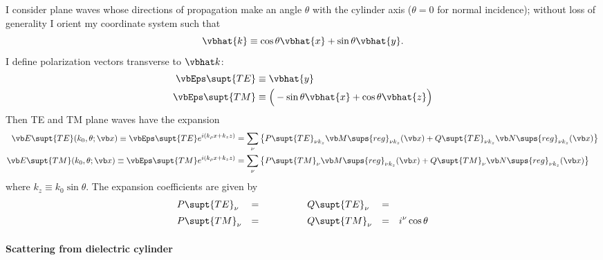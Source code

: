 \documentclass[letterpaper]{article}
\begin{document}
I consider plane waves whose directions of propagation make
an angle $\theta$ with the cylinder axis ($\theta=0$ for normal
incidence); without loss of generality I orient my coordinate system
such that
$$ \vbhat{k} \equiv \cos\theta \vbhat{x} + \sin\theta \vbhat{y}.$$
I define polarization vectors transverse to $\vbhat k$:
\begin{align*}
 \vbEps\supt{TE} &\equiv \vbhat{y} \\
 \vbEps\supt{TM} &\equiv \Big( -\sin\theta \vbhat{x} + \cos\theta\vbhat{z}
                         \Big)
\end{align*}
Then TE and TM plane waves have the expansion
\begin{align*}
 \vb E\supt{TE}(k_0, \theta; \vb x)
\equiv 
\vbEps\supt{TE} e^{i(k_\rho x + k_z z)}
&=\sum_\nu 
     \left\{  P\supt{TE}_{\nu k_z}\vb M\sups{reg}_{\nu k_z}(\vb x)
            + Q\supt{TE}_{\nu k_z}\vb N\sups{reg}_{\nu k_z}(\vb x)
     \right\}
\\
 \vb E\supt{TM}(k_0, \theta; \vb x)
\equiv 
\vbEps\supt{TM} e^{i(k_\rho x + k_z z)}
&=\sum_\nu 
     \left\{  P\supt{TM}_{\nu}\vb M\sups{reg}_{\nu k_z}(\vb x)
            + Q\supt{TM}_{\nu}\vb N\sups{reg}_{\nu k_z}(\vb x)
     \right\}
\end{align*}
where $k_z\equiv k_0\sin\theta$. The expansion coefficients are 
given by
$$\begin{array}{lclclcl}
 \displaystyle{ P\supt{TE}_{\nu} }
 &=&
 \displaystyle{ 
              }
 &\qquad& 
 \displaystyle{ Q\supt{TE}_{\nu} }
 &=&
 \displaystyle{ 
              }
 \\[5pt]
 \displaystyle{ P\supt{TM}_{\nu} }
 &=&
 \displaystyle{ 
              }
 &\qquad&
 \displaystyle{ Q\supt{TM}_{\nu} }
 &=&
 \displaystyle{ i^\nu \cos\theta
              }
 \end{array}
$$

\paragraph{Scattering from dielectric cylinder}
\end{document}
